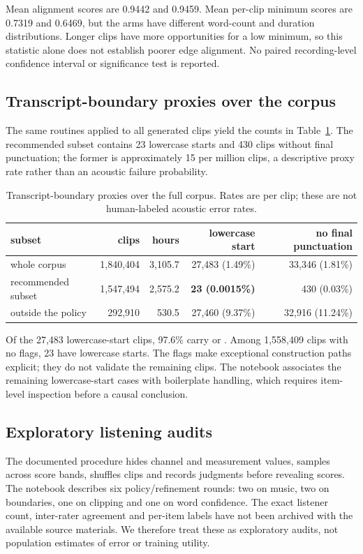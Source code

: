 \documentclass[11pt,a4paper]{article}
\begin{document}
Mean alignment scores are 0.9442 and 0.9459. Mean per-clip minimum scores
are 0.7319 and 0.6469, but the arms have different word-count and duration
distributions. Longer clips have more opportunities for a low minimum, so
this statistic alone does not establish poorer edge alignment. No paired
recording-level confidence interval or significance test is reported.

\subsection{Transcript-boundary proxies over the corpus}
\label{sec:integrity}
The same routines applied to all generated clips yield the counts in
Table~\ref{tab:integrity}. The recommended subset contains 23 lowercase
starts and 430 clips without final punctuation; the former is approximately
15 per million clips, a descriptive proxy rate rather than an acoustic
failure probability.

\begin{table}[t]
\centering
\small
\begin{tabular}{lrrrr}
\toprule
subset & clips & hours & lowercase start & no final punctuation \\
\midrule
whole corpus & 1,840,404 & 3,105.7 & 27,483 (1.49\%) & 33,346 (1.81\%) \\
recommended subset & 1,547,494 & 2,575.2 & \textbf{23 (0.0015\%)} & 430 (0.03\%) \\
outside the policy & 292,910 & 530.5 & 27,460 (9.37\%) & 32,916 (11.24\%) \\
\bottomrule
\end{tabular}
\caption{Transcript-boundary proxies over the full corpus. Rates are per clip; these are not human-labeled acoustic error rates.}
\label{tab:integrity}
\end{table}

Of the 27,483 lowercase-start clips, 97.6\% carry  or
. Among 1,558,409 clips with no flags, 23 have lowercase
starts. The flags make exceptional construction paths explicit; they do not
validate the remaining clips. The notebook associates the remaining
lowercase-start cases with boilerplate handling, which requires item-level
inspection before a causal conclusion.

\subsection{Exploratory listening audits}
\label{sec:negative}
The documented procedure hides channel and measurement values, samples across
score bands, shuffles clips and records judgments before revealing scores.
The notebook describes six policy/refinement rounds: two on music, two on
boundaries, one on clipping and one on word confidence. The exact listener
count, inter-rater agreement and per-item labels have not been archived with the available source materials. We therefore treat these as exploratory audits, not
population estimates of error or training utility.
\end{document}
